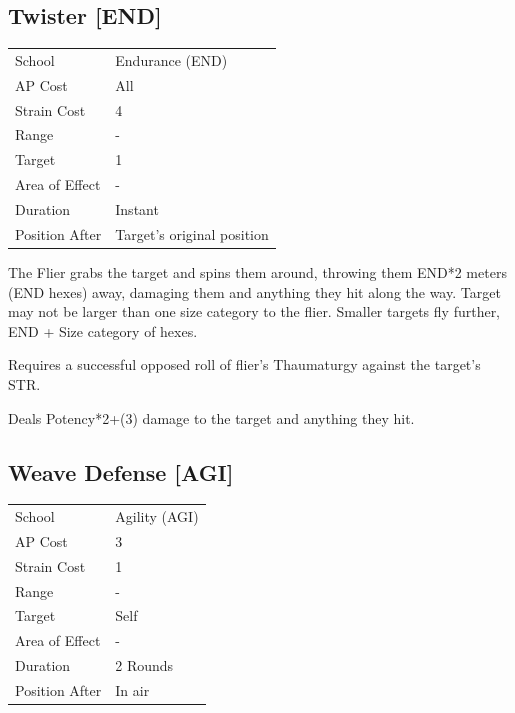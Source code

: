 \documentclass[11pt,a4paper,twocolumn]{book}
\begin{document}
\subsection*{Twister [END]}
{
	\begin{tabu} to 75mm{| X[l,4] | X[l,7] |}
		\hline
		School 			& Endurance (END) 	\\
        AP Cost	      	& All 				\\
        Strain Cost     & 4 				\\
        Range     		& - 				\\
        Target      	& 1 				\\
        Area of Effect  & - 	 			\\
        Duration     	& Instant 	 		\\
		Position After  & Target's original position 		\\ \hline
	\end{tabu}
		
}

\medskip

The Flier grabs the target and spins them around, throwing them END*2 meters (END hexes) away, damaging them and anything they hit along the way. Target may not be larger than one size category to the flier. Smaller targets fly further, END + Size category of hexes.

Requires a successful opposed roll of flier's Thaumaturgy against the target's STR.

Deals Potency*2+(3) damage to the target and anything they hit.


\subsection*{Weave Defense [AGI]}
{
	\begin{tabu} to 75mm{| X[l,4] | X[l,7] |}
		\hline
		School 			& Agility (AGI) 	\\
        AP Cost	      	& 3 				\\
        Strain Cost     & 1 				\\
        Range     		& - 				\\
        Target      	& Self 				\\
        Area of Effect  & - 	 			\\
        Duration     	& 2 Rounds	 			\\
		Position After  & In air 			\\ \hline
	\end{tabu}
		
}
\end{document}

